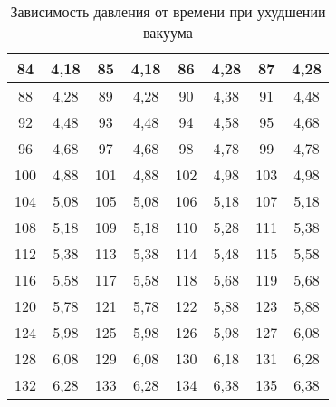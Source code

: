 \begin{table}[h]
\begin{tabular}[h]{|c|c|c|c|c|c|c|c|}
        \hline
        84 & 4,18 & 85 & 4,18 & 86 & 4,28 & 87 & 4,28\\
        \hline
        88 & 4,28 & 89 & 4,28 & 90 & 4,38 & 91 & 4,48\\
        \hline
        92 & 4,48 & 93 & 4,48 & 94 & 4,58 & 95 & 4,68\\
        \hline
        96 & 4,68 & 97 & 4,68 & 98 & 4,78 & 99 & 4,78\\
        \hline
        100 & 4,88 & 101 & 4,88 & 102 & 4,98 & 103 & 4,98\\
        \hline
        104 & 5,08 & 105 & 5,08 & 106 & 5,18 & 107 & 5,18\\
        \hline
        108 & 5,18 & 109 & 5,18 & 110 & 5,28 & 111 & 5,38\\
        \hline
        112 & 5,38 & 113 & 5,38 & 114 & 5,48 & 115 & 5,58\\
        \hline
        116 & 5,58 & 117 & 5,58 & 118 & 5,68 & 119 & 5,68\\
        \hline
        120 & 5,78 & 121 & 5,78 & 122 & 5,88 & 123 & 5,88\\
        \hline
        124 & 5,98 & 125 & 5,98 & 126 & 5,98 & 127 & 6,08\\
        \hline
        128 & 6,08 & 129 & 6,08 & 130 & 6,18 & 131 & 6,28\\
        \hline
        132 & 6,28 & 133 & 6,28 & 134 & 6,38 & 135 & 6,38\\
        \hline
\end{tabular}
\caption{Зависимость давления от времени при ухудшении вакуума}
\end{table}
